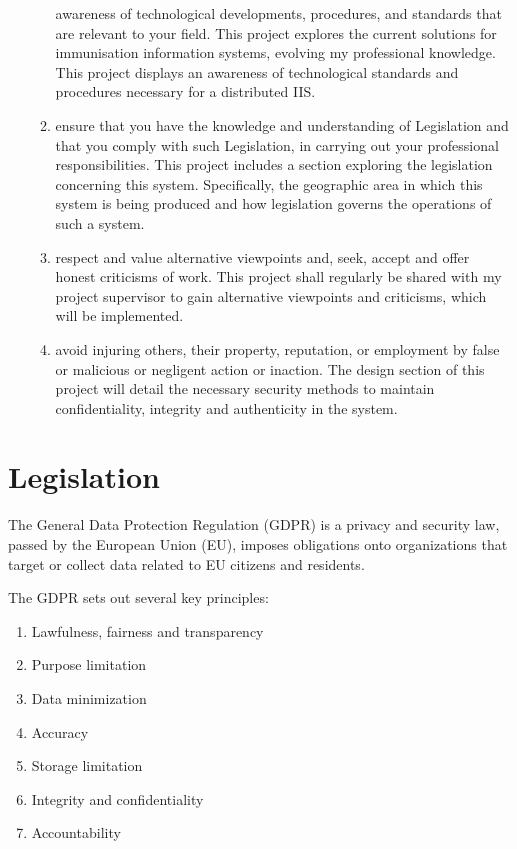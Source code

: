 \documentclass{report}
\begin{document}
\begin{flushleft}
\begin{enumerate}
\begin{enumerate}
    awareness of technological developments,
    procedures, and standards that are relevant to your
    field.
    This project explores the current solutions for
    immunisation information systems, evolving my
    professional knowledge. This project displays an
    awareness of technological standards and procedures necessary for a distributed IIS.
    \item ensure that you have the knowledge and
    understanding of Legislation and that you comply
    with such Legislation, in carrying out your
    professional responsibilities.
    This project includes a section exploring the
    legislation concerning this system. Specifically, the
    geographic area in which this system is being
    produced and how legislation governs the operations
    of such a system.
    \item respect and value alternative viewpoints and,
    seek, accept and offer honest criticisms of work.
    This project shall regularly be shared with my project
    supervisor to gain alternative viewpoints and
    criticisms, which will be implemented.
    \item avoid injuring others, their property, reputation,
    or employment by false or malicious or negligent
    action or inaction.
    The design section of this project will detail the
    necessary security methods to maintain
    confidentiality, integrity and authenticity in the
    system. %
 \end{enumerate}
 \end{enumerate}

 \section{Legislation}
 The General Data Protection Regulation (GDPR) is a privacy
 and security law, passed by the European Union (EU),
 imposes obligations onto organizations that target or collect
 data related to EU citizens and residents.\cite{noauthor_general_nodate} \linebreak[1]

The GDPR sets out several key principles:
\begin{enumerate}
  \item Lawfulness, fairness and transparency
  \item Purpose limitation
  \item Data minimization
  \item Accuracy
  \item Storage limitation
  \item Integrity and confidentiality
  \item Accountability
\end{enumerate}


\end{flushleft}
\end{document}
